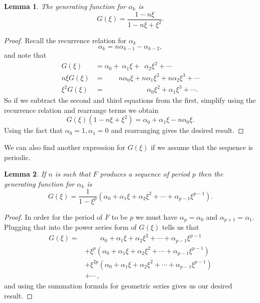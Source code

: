 \documentclass[12pt]{article}
\newtheorem{lemma}{Lemma}
\begin{document}
\begin{lemma} The generating function for $\alpha_k$ is 
\begin{equation*}
G(\xi) = \frac{ 1 - n\xi}{1 - n \xi + \xi^2} .
\end{equation*}
\end{lemma}
\begin{proof}
Recall the recurrence relation for $\alpha_k$ 
\begin{equation*}
\alpha_k = n \alpha_{k-1} - \alpha_{k-2}, 
\end{equation*}
and note that 
\begin{align*}
G(\xi) &= \alpha_0 + \> \alpha_1 \xi + \>\> \alpha_2 \xi^2 + \cdots \\
n \xi G(\xi) &= \qquad n\alpha_0 \xi + n\alpha_1 \xi^2 + n\alpha_2 \xi^3 + \cdots \\
\xi^2 G(\xi) &= \qquad \qquad \quad \quad \alpha_0 \xi^2 + \alpha_1 \xi^3 +  \cdots.
\end{align*}
So if we subtract the second and third equations from the first, simplify using the recurrence relation and rearrange terms we obtain
\begin{equation*}
G( \xi) (1-n \xi + \xi^2) = \alpha_0 + \alpha_1 \xi - n\alpha_0 \xi.
\end{equation*}
Using the fact that $\alpha_0=1, \alpha_1=0$ and rearranging gives the desired result.
\end{proof}

We can also find another expression for $G(\xi)$ if we assume that the sequence is periodic. 
\begin{lemma} If $n$ is such that $F$ produces a sequence of period $p$ then the generating function for $\alpha_k$ is 
\begin{equation*}
G(\xi) = \frac{1}{1- \xi^p} (\alpha_0 + \alpha_1 \xi + \alpha_2 \xi^2 + \cdots + \alpha_{p-1} \xi^{p-1}).
\end{equation*}
\end{lemma}
\begin{proof}
In order for the period of $F$ to be $p$ we must have $\alpha_p= \alpha_0$ and $\alpha_{p+1} = \alpha_1$. Plugging that into the power series form of $G(\xi)$ tells us that
\begin{align*}
G(\xi) =&  \qquad \> \alpha_0 + \alpha_1 \xi + \alpha_2 \xi^2 + \cdots + \alpha_{p-1} \xi^{p-1} \\
 &+ \xi^p(\alpha_0 + \alpha_1 \xi + \alpha_2 \xi^2 + \cdots + \alpha_{p-1} \xi^{p-1}) \\ 
 &+ \xi^{2p}(\alpha_0 + \alpha_1 \xi + \alpha_2 \xi^2 + \cdots + \alpha_{p-1} \xi^{p-1}) \\ 
 &+ \cdots \, ,
\end{align*}
and using the summation formula for geometric series gives us our desired result.
\end{proof}
\end{document}
